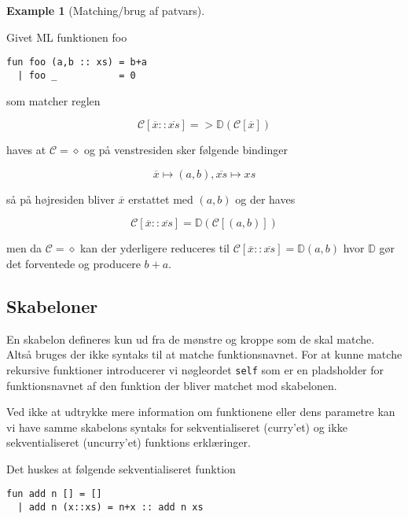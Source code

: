 \documentclass[oneside]{memoir}
\theoremstyle{definition}
\newtheorem{example}{Example}
\begin{document}
\begin{example}[Matching/brug af patvars] \

  
   Givet ML funktionen foo

\begin{verbatim}
fun foo (a,b :: xs) = b+a
  | foo _           = 0
\end{verbatim}

  som matcher reglen

  \[
  \mathcal{C}[\overline{x}::\overline{xs}] =>
  \mathbb{D}(\mathcal{C}[\overline{x}])
  \]

  haves at $\mathcal{C} = \diamond$ og på venstresiden sker følgende
  bindinger

  \[
  \overline{x} \mapsto (a,b), \overline{xs} \mapsto xs
  \]

  så på højresiden bliver $\overline{x}$ erstattet med $(a,b)$ og der haves
  
  \[
  \mathcal{C} [\overline{x}::\overline{xs}] = \mathbb{D}(\mathcal{C}[(a,b)
  ])
  \]

  men da $\mathcal{C} = \diamond$ kan der yderligere reduceres til
  $\mathcal{C} [\overline{x}::\overline{xs}] = \mathbb{D}(a,b)$ hvor
  $\mathbb{D}$ gør det forventede og producere $b+a$.


\end{example}


\subsection{Skabeloner}

En skabelon defineres kun ud fra de mønstre og kroppe som de skal matche. Altså
bruges der ikke syntaks til at matche funktionsnavnet. For at kunne matche
rekursive funktioner introducerer vi nøgleordet \texttt{self} som er en
pladsholder for funktionsnavnet af den funktion der bliver matchet mod
skabelonen.

Ved ikke at udtrykke mere information om funktionene eller dens parametre kan vi
have samme skabelons syntaks for sekventialiseret (curry'et) og ikke
sekventialiseret (uncurry'et) funktions erklæringer.

Det huskes at følgende sekventialiseret funktion 

\begin{verbatim}
fun add n [] = []
  | add n (x::xs) = n+x :: add n xs
\end{verbatim}
\end{document}

